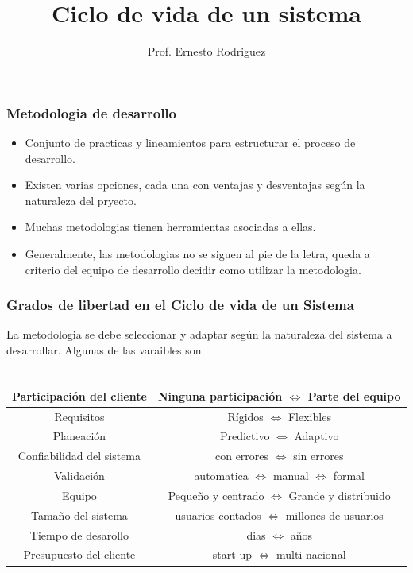 \documentclass{beamer}
\title[Ciclo de vida]{Ciclo de vida de un sistema}
\author{Prof. Ernesto Rodriguez}
\institute{
    Universidad del Itsmo \\
    \medskip \textit{erodriguez@unis.edu.gt}
}
\date[\today]{}
\begin{document}
\begin{frame}
\titlepage
\end{frame}

\begin{frame}
    \frametitle{Metodologia de desarrollo}
    \begin{itemize}
        \item{Conjunto de practicas y lineamientos para
        estructurar el proceso de desarrollo.}
        \item{Existen varias opciones, cada una con ventajas
        y desventajas seg\'un la naturaleza del pryecto.}
        \item{Muchas metodologias tienen herramientas
        asociadas a ellas.}
        \item{Generalmente, las metodologias no se siguen
        al pie de la letra, queda a criterio del equipo de
        desarrollo decidir como utilizar la metodologia.}
    \end{itemize}
\end{frame}

\begin{frame}
    \frametitle{Grados de libertad en el Ciclo de vida de un Sistema}
    La metodologia se debe seleccionar y adaptar seg\'un la naturaleza
    del sistema a desarrollar. Algunas de las varaibles son:\\~\\
    \begin{tabular}{|c|c|}
        \hline
        Participaci\'on del cliente & Ninguna participaci\'on $\Leftrightarrow$ Parte del equipo \\
        \hline
        Requisitos & R\'igidos $\Leftrightarrow$ Flexibles\\
        \hline
        Planeaci\'on & Predictivo $\Leftrightarrow$ Adaptivo \\ 
        \hline
        Confiabilidad del sistema & con errores $\Leftrightarrow$ sin errores \\
        \hline
        Validaci\'on & automatica $\Leftrightarrow$ manual $\Leftrightarrow$ formal \\
        \hline
        Equipo & Peque\~no y centrado $\Leftrightarrow$ Grande y distribuido \\
        \hline
        Tama\~no del sistema & usuarios contados $\Leftrightarrow$ millones de usuarios \\
        \hline
        Tiempo de desarollo & dias $\Leftrightarrow$ a\~nos \\
        \hline
        Presupuesto del cliente & start-up $\Leftrightarrow$ multi-nacional \\
        \hline
    \end{tabular}
\end{frame}
\end{document}
